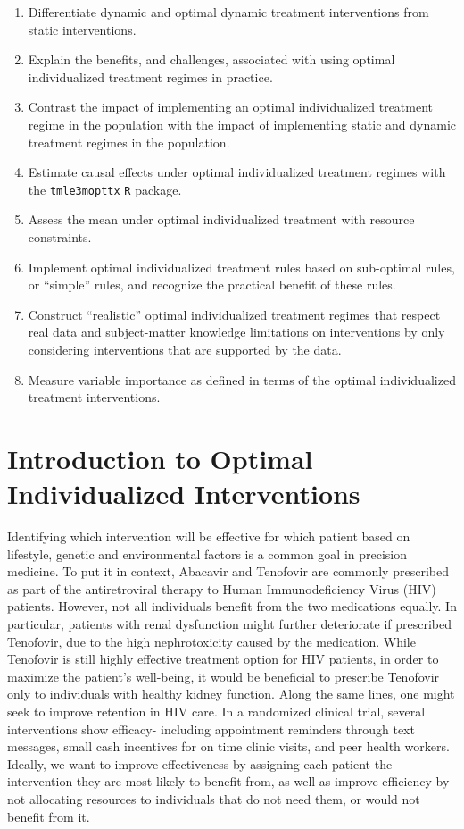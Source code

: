 \documentclass[12pt, krantz2,]{book}
\providecommand{\tightlist}{%
  \setlength{\itemsep}{0pt}\setlength{\parskip}{0pt}}
\theoremstyle{definition}
\theoremstyle{definition}
\theoremstyle{definition}
\newcommand{\1}{\mathbbm{1}}
\begin{document}
\begin{enumerate}
\def\labelenumi{\arabic{enumi}.}
\tightlist
\item
  Differentiate dynamic and optimal dynamic treatment interventions from static
  interventions.
\item
  Explain the benefits, and challenges, associated with using optimal
  individualized treatment regimes in practice.
\item
  Contrast the impact of implementing an optimal individualized treatment
  regime in the population with the impact of implementing static and dynamic
  treatment regimes in the population.
\item
  Estimate causal effects under optimal individualized treatment regimes with
  the \texttt{tmle3mopttx} \texttt{R} package.
\item
  Assess the mean under optimal individualized treatment with resource
  constraints.
\item
  Implement optimal individualized treatment rules based on sub-optimal
  rules, or ``simple'' rules, and recognize the practical benefit of these rules.
\item
  Construct ``realistic'' optimal individualized treatment regimes that respect
  real data and subject-matter knowledge limitations on interventions by
  only considering interventions that are supported by the data.
\item
  Measure variable importance as defined in terms of the optimal individualized
  treatment interventions.
\end{enumerate}

\hypertarget{introduction-to-optimal-individualized-interventions}{%
\section{Introduction to Optimal Individualized Interventions}\label{introduction-to-optimal-individualized-interventions}}

Identifying which intervention will be effective for which patient based on
lifestyle, genetic and environmental factors is a common goal in precision
medicine. To put it in context, Abacavir and Tenofovir are commonly prescribed
as part of the antiretroviral therapy to Human Immunodeficiency Virus (HIV)
patients. However, not all individuals benefit from the two medications equally.
In particular, patients with renal dysfunction might further deteriorate if
prescribed Tenofovir, due to the high nephrotoxicity caused by the medication.
While Tenofovir is still highly effective treatment option for HIV patients, in
order to maximize the patient's well-being, it would be beneficial to prescribe
Tenofovir only to individuals with healthy kidney function. Along the same
lines, one might seek to improve retention in HIV care. In a randomized clinical
trial, several interventions show efficacy- including appointment reminders
through text messages, small cash incentives for on time clinic visits, and peer
health workers. Ideally, we want to improve effectiveness by assigning each
patient the intervention they are most likely to benefit from, as well as
improve efficiency by not allocating resources to individuals that do not need
them, or would not benefit from it.
\end{document}
